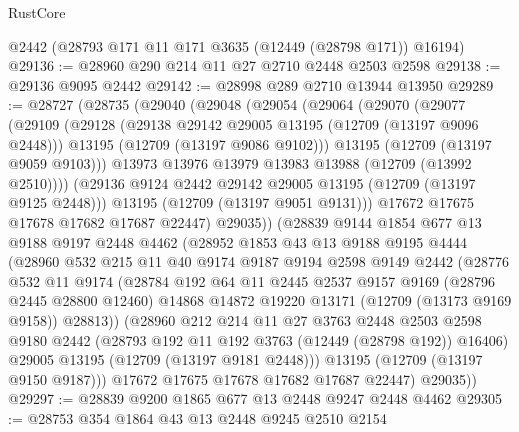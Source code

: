 \begin{lexlean}{RustCore}
\begin{coremodule}
    @2442
    (@28793 @171 @11 @171 @3635 (@12449 (@28798 @171)) @16194)
@29136 := @28960 @290 @214 @11 @27 @2710 @2448 @2503 @2598
@29138 := @29136 @9095 @2442
@29142 := @28998 @289 @2710 @13944 @13950
@29289 := @28727
    (@28735
      (@29040
        (@29048
          (@29054
            (@29064
              (@29070
                (@29077
                  (@29109
                    (@29128
                      (@29138 @29142 @29005 @13195 (@12709 (@13197 @9096 @2448)))
                      @13195
                      (@12709 (@13197 @9086 @9102)))
                    @13195
                    (@12709 (@13197 @9059 @9103)))
                  @13973
                  @13976
                  @13979
                  @13983
                  @13988
                  (@12709 (@13992 @2510))))
              (@29136 @9124 @2442 @29142 @29005 @13195 (@12709 (@13197 @9125 @2448)))
              @13195
              (@12709 (@13197 @9051 @9131)))
            @17672
            @17675
            @17678
            @17682
            @17687
            @22447)
          @29035))
      (@28839
        @9144
        @1854
        @677
        @13
        @9188
        @9197
        @2448
        @4462
        (@28952
          @1853
          @43
          @13
          @9188
          @9195
          @4444
          (@28960
            @532
            @215
            @11
            @40
            @9174
            @9187
            @9194
            @2598
            @9149
            @2442
            (@28776
              @532
              @11
              @9174
              (@28784
                @192
                @64
                @11
                @2445
                @2537
                @9157
                @9169
                (@28796 @2445 @28800 @12460)
                @14868
                @14872
                @19220
                @13171
                (@12709 (@13173 @9169 @9158))
                @28813))
            (@28960
              @212
              @214
              @11
              @27
              @3763
              @2448
              @2503
              @2598
              @9180
              @2442
              (@28793 @192 @11 @192 @3763 (@12449 (@28798 @192)) @16406)
              @29005
              @13195
              (@12709 (@13197 @9181 @2448)))
            @13195
            (@12709 (@13197 @9150 @9187)))
          @17672
          @17675
          @17678
          @17682
          @17687
          @22447)
        @29035))
@29297 := @28839 @9200 @1865 @677 @13 @2448 @9247 @2448 @4462
@29305 := @28753 @354 @1864 @43 @13 @2448 @9245 @2510 @2154

\end{coremodule}
\end{lexlean}
